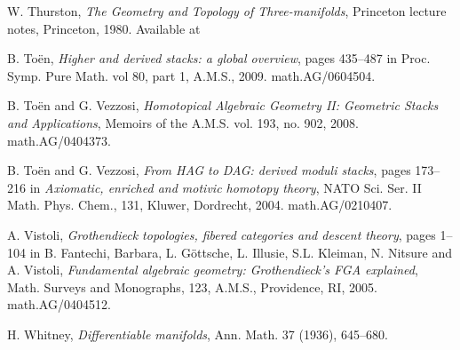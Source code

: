 \documentclass{article}
\begin{document}
\begin{thebibliography}{99}
 W. Thurston, {\it The Geometry and Topology of
Three-manifolds}, Princeton lecture notes, Princeton, 1980.
Available at \hfil{}

 B. To\"en, {\it Higher and derived stacks: a global
overview}, pages 435--487 in Proc. Symp. Pure Math. vol 80, part 1,
A.M.S., 2009. math.AG/0604504.

 B. To\"en and G. Vezzosi, {\it Homotopical Algebraic
Geometry II: Geometric Stacks and Applications}, Memoirs of the
A.M.S. vol. 193, no. 902, 2008. math.AG/0404373.

 B. To\"en and G. Vezzosi, {\it From HAG to DAG:
derived moduli stacks}, pages 173--216 in {\it Axiomatic, enriched
and motivic homotopy theory}, NATO Sci. Ser. II Math. Phys. Chem.,
131, Kluwer, Dordrecht, 2004. math.AG/0210407.

 A. Vistoli, {\it Grothendieck topologies,
fibered categories and descent theory}, pages 1--104 in B. Fantechi,
Barbara, L. G\"ottsche, L. Illusie, S.L. Kleiman, N. Nitsure and A.
Vistoli, {\it Fundamental algebraic geometry: Grothendieck's FGA
explained}, Math. Surveys and Monographs, 123, A.M.S., Providence,
RI, 2005. math.AG/0404512.

 H. Whitney, {\it Differentiable manifolds}, Ann.
Math. 37 (1936), 645--680.

\end{thebibliography}

\clearpage
\printnomenclature[1.3cm]
\clearpage
{}
\printindex
\end{document}

